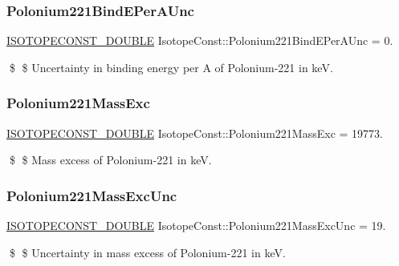 \subsubsection{\texorpdfstring{Polonium221\+Bind\+E\+Per\+A\+Unc}{Polonium221BindEPerAUnc}}
{\footnotesize\ttfamily \mbox{\hyperlink{group___isotope_const-_macros_ga8f45a7272ce02c0b4c65c44636ed719a}{I\+S\+O\+T\+O\+P\+E\+C\+O\+N\+S\+T\+\_\+\+D\+O\+U\+B\+LE}} Isotope\+Const\+::\+Polonium221\+Bind\+E\+Per\+A\+Unc = 0.}

\$ \$ Uncertainty in binding energy per A of Polonium-\/221 in keV. \mbox{\label{group___isotope_const-_polonium-_po221_ga7cd6b4ecf9b2c9cba8928536e73ab5e9}} 
\subsubsection{\texorpdfstring{Polonium221\+Mass\+Exc}{Polonium221MassExc}}
{\footnotesize\ttfamily \mbox{\hyperlink{group___isotope_const-_macros_ga8f45a7272ce02c0b4c65c44636ed719a}{I\+S\+O\+T\+O\+P\+E\+C\+O\+N\+S\+T\+\_\+\+D\+O\+U\+B\+LE}} Isotope\+Const\+::\+Polonium221\+Mass\+Exc = 19773.}

\$ \$ Mass excess of Polonium-\/221 in keV. \mbox{\label{group___isotope_const-_polonium-_po221_ga69909bc7dcdcdebc865daf054f4d30b6}} 
\subsubsection{\texorpdfstring{Polonium221\+Mass\+Exc\+Unc}{Polonium221MassExcUnc}}
{\footnotesize\ttfamily \mbox{\hyperlink{group___isotope_const-_macros_ga8f45a7272ce02c0b4c65c44636ed719a}{I\+S\+O\+T\+O\+P\+E\+C\+O\+N\+S\+T\+\_\+\+D\+O\+U\+B\+LE}} Isotope\+Const\+::\+Polonium221\+Mass\+Exc\+Unc = 19.}

\$ \$ Uncertainty in mass excess of Polonium-\/221 in keV. \mbox{\label{group___isotope_const-_polonium-_po221_gae555443e4b4c2704a40b96694425457d}} 
